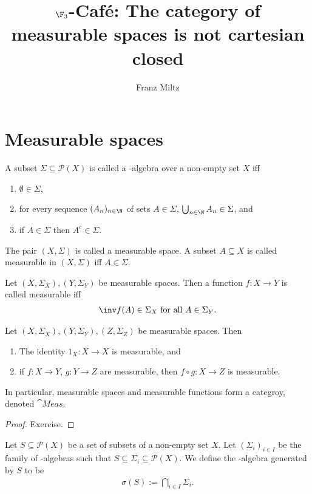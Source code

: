 \documentclass{article}
\title{$\F_3$-Caf\'e: The category of measurable spaces is not cartesian closed}
\author{Franz Miltz}
\begin{document}
\maketitle

\section{Measurable spaces}

\begin{definition}
	A subset $\Sigma\subseteq\mathcal{P}(X)$ is called a \sigma-algebra over a non-empty set $X$
	iff
	\begin{enumerate}
		\item $\emptyset\in\Sigma$,
		\item for every sequence $(A_n)_{n\in\N}$ of sets $A\in\Sigma$, $\bigcup_{n\in\N}A_n\in\Sigma$, and
		\item if $A\in\Sigma$ then $A^c\in\Sigma$.
	\end{enumerate}
	The pair $(X,\Sigma)$ is called a measurable space. A subset $A\subseteq X$ is called measurable
	in $(X,\Sigma)$ iff $A\in\Sigma$.
\end{definition}

\begin{definition}
	Let $(X, \Sigma_X),(Y,\Sigma_Y)$ be measurable spaces. Then a function $f:X\to Y$ is called measurable
	iff
	\begin{align}
		\label{measurable_cond}
		\inv f(A)\in \Sigma_X \text{ for all }A\in\Sigma_Y.
	\end{align}
\end{definition}

\begin{proposition}
	Let $(X,\Sigma_X),(Y,\Sigma_Y),(Z,\Sigma_Z)$ be measurable spaces. Then
	\begin{enumerate}
		\item The identity $1_X:X\to X$ is measurable, and
		\item if $f:X\to Y$, $g:Y\to Z$ are measurable, then $f\circ g:X\to Z$ is measurable.
	\end{enumerate}
	In particular, measurable spaces and measurable functions form a categroy, denoted $\cat{Meas}$.
	\begin{proof}
		Exercise.
	\end{proof}
\end{proposition}

\begin{definition}
	Let $S\subseteq\mathcal{P}(X)$ be a set of subsets of a non-empty set $X$. Let $(\Sigma_i)_{i\in I}$
	be the family of \sigma-algebras such that $S\subseteq\Sigma_i\subseteq\mathcal{P}(X)$.
	We define the
	\sigma-algebra generated by $S$ to be
	\begin{align*}
		\sigma(S):=\bigcap_{i\in I}\Sigma_i.
	\end{align*}
\end{definition}
\end{document}
